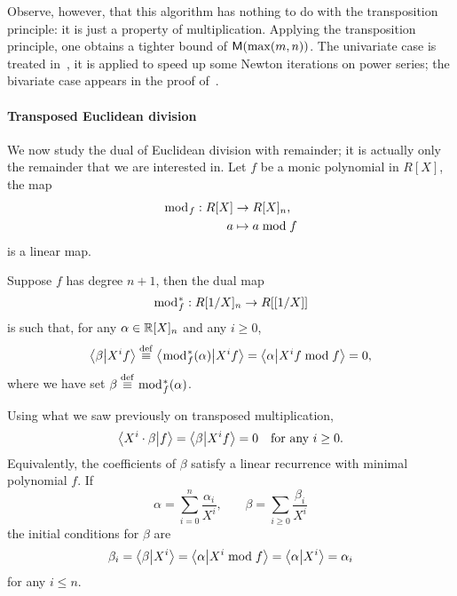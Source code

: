 Observe, however, that this algorithm has nothing to do with the
transposition principle: it is just a property of
multiplication. Applying the transposition principle, one obtains a
tighter bound of $\mathsf{M}(\max(m,n))$. The univariate case is treated
in~\cite{hanrot+quercia+zimmermann,bostan+lecerf+schost:tellegen}, it
is applied to speed up some Newton iterations on power series; the
bivariate case appears in the proof
of~\cite[Corollary~2]{pascal+schost06}.

\paragraph{Transposed Euclidean division}
\label{sec:transp-eucl-divis}
{\ifafourps{}\fi
We now study the dual of Euclidean division with remainder; it is
actually only the remainder that we are interested in. Let $f$ be a
monic polynomial in $R[X]$, the map 
\begin{equation}
  \label{eq:238}
  \begin{aligned}
    \bmod_f:R[X]&\rightarrow R[X]_n\text{,}\\
    a&\mapsto a\bmod f
  \end{aligned}
\end{equation}
is a linear map.}

Suppose $f$ has degree $n+1$, then the dual map
\begin{equation}
  \label{eq:233}
  \bmod_f^\ast:R[1/X]_n\rightarrow R[[1/X]]  
\end{equation}
is such that, for any $\alpha\in\mathbb{R}[X]_n$ and any $i\ge0$,
\begin{equation}
  \label{eq:234}
  \left\langle \beta \middle| X^if \right\rangle \overset{\mathrm{def}}{\equiv} \left\langle \bmod_f^\ast(\alpha) \middle| X^if \right\rangle = 
  \left\langle \alpha \middle| X^if\bmod f \right\rangle = 0
  \text{,}
\end{equation}
where we have set $\beta\overset{\mathrm{def}}{\equiv}\bmod_f^\ast(\alpha)$.

Using what we saw previously on transposed multiplication,
\begin{equation}
  \label{eq:235}
  \left\langle X^i\cdot\beta \middle| f \right\rangle = \left\langle \beta \middle| X^if \right\rangle = 0
  \quad\text{for any $i\ge0$.}
\end{equation}
Equivalently, the coefficients of $\beta$ satisfy a linear recurrence
with minimal polynomial $f$. If
\begin{equation}
  \label{eq:236}
  \alpha = \sum_{i=0}^{n}\frac{\alpha_i}{X^i}
  \text{,}\qquad
  \beta = \sum_{i\ge0}\frac{\beta_i}{X^i}
\end{equation}
the initial conditions for $\beta$ are
\begin{equation}
  \label{eq:237}
  \beta_i = \left\langle \beta \middle| X^i \right\rangle = \left\langle \alpha \middle| X^i\bmod f \right\rangle = \left\langle \alpha \middle| X^i \right\rangle = \alpha_i
\end{equation}
for any $i\le n$.

